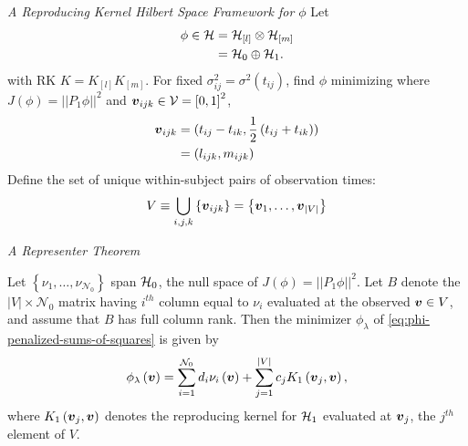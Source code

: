 \begin{frame}{\textit{A Reproducing Kernel Hilbert Space Framework for $\phi$}}{}
\footnotesize
Let
\begin{align*}
\phi \in \mathcal{H} &= \mathcal{H}_{\left[l\right]} \otimes \mathcal{H}_{\left[m\right]} \\
&= \mathcal{H}_0 \oplus \mathcal{H}_1.
\end{align*}
\footnotesize
with RK $K = K_{\left[l\right]}K_{\left[m\right]}$. For fixed $\sigma_{ij}^2 = \sigma^2\left(t_{ij}\right)$,  find $\phi$ minimizing
\footnotesize
where $J\left(\phi\right) =\vert \vert P_1 \phi \vert\vert^2$ and $\mbox{\boldmath $v$}_{ijk} \in \mathcal{V} = \left[0,1\right]^2$, 
\begin{align*}
\mbox{\boldmath $v$}_{ijk} &= (t_{ij} - t_{ik}, \frac{1}{2}\left(t_{ij} + t_{ik}\right)) \\ 
&= \left(l_{ijk}, m_{ijk}\right)
\end{align*}
Define the set of unique within-subject pairs of observation times:  
\[
V \equiv \bigcup\limits_{i,j,k} \left\{\mbox{\boldmath $v$}_{ijk} \right\} = \left\{ \mbox{\boldmath $v$}_1,\dots,\mbox{\boldmath $v$}_{\vert V \vert} \right\}
\]

\end{frame}

\begin{frame}{\textit{A Representer Theorem}}{}

 \begin{theorem} \label{theorem:finite-dimensional-minimizer}
 Let $\left\{\nu_1,\dots, \nu_{\mathcal{N}_0}\right\}$ span $\mathcal{H}_0$, the null space of $J\left(\phi\right) = \vert \vert P_1 \phi\vert\vert^2$. Let $B$ denote the $\vert V \vert \times \mathcal{N}_0$ matrix having $i^{th}$ column equal to $\nu_i$ evaluated at the observed $\mbox{\boldmath $v$} \in V$, and assume that $B$ has full column rank. Then the minimizer $\phi_\lambda$ of \eqref{eq:phi-penalized-sums-of-squares} is given by
 \begin{equation} \label{eq:form-of-the-minimizer-phi}
\phi_\lambda\left(\mbox{\boldmath $v$}\right) = \sum_{i = 1}^{\mathcal{N}_0} d_i \nu_{i}\left(\mbox{\boldmath $v$}\right) + \sum_{j = 1}^{\vert V \vert} c_j K_1\left(\mbox{\boldmath $v$}_j, \mbox{\boldmath $v$}\right),
\end{equation}
\noindent
where $K_1\left(\mbox{\boldmath $v$}_j, \mbox{\boldmath $v$} \right)$ denotes the reproducing kernel for $\mathcal{H}_1$ evaluated at ${\mbox{\boldmath $v$}_j}$, the $j^{th}$ element of $V$.
\end{theorem}

\end{frame}


